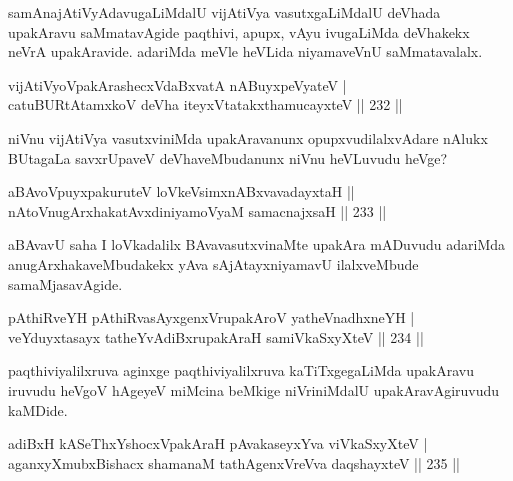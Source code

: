 \begin{artha}
samAnajAtiVyAdavugaLiMdalU vijAtiVya vasutxgaLiMdalU deVhada upakAravu saMmatavAgide paqthivi, apupx, vAyu ivugaLiMda deVhakekx neVrA upakAravide. adariMda meVle heVLida niyamaveVnU saMmatavalalx.
\end{artha}

\begin{shl}
vijAtiVyoVpakArashecxVdaBxvatA nABuyxpeVyateV | \\
catuBURtAtamxkoV deVha iteyxVtatakxthamucayxteV \hfill ||  232 ||  
\end{shl}

\begin{artha}
niVnu vijAtiVya vasutxviniMda upakAravanunx opupxvudilalxvAdare nAlukx BUtagaLa savxrUpaveV deVhaveMbudanunx niVnu heVLuvudu heVge?
\end{artha}

\begin{shl}
\footnotemark[2]{}aBAvoV\s puyxpakuruteV loVkeV\s simxnABxvavadayxtaH ||  \\
nAtoV\s nugArxhakatAvxdiniyamoV\s yaM samacnajxsaH \hfill ||  233 || 
\end{shl}

\begin{artha}
aBAvavU saha I loVkadalilx BAvavasutxvinaMte upakAra mADuvudu adariMda anugArxhakaveMbudakekx yAva sAjAtayxniyamavU ilalxveMbude samaMjasavAgide.
\end{artha}

\begin{shl}
pAthiRveYH pAthiRvasAyxgenxVrupakAroV yatheVnadhxneYH | \\
veYduyxtasayx tatheYvAdiBxrupakAraH samiVkaSxyXteV \hfill ||  234 ||  
\end{shl}

\begin{artha}
paqthiviyalilxruva aginxge paqthiviyalilxruva kaTiTxgegaLiMda upakAravu iruvudu heVgoV hAgeyeV miMcina beMkige niVriniMdalU upakAravAgiruvudu kaMDide.
\end{artha}

\begin{shl}
adiBxH kASeThxYshocxVpakAraH pAvakaseyxYva viVkaSxyXteV | \\
aganxyXmubxBishacx shamanaM tathA\s genxVreVva daqshayxteV \hfill ||  235 ||  
\end{shl}

